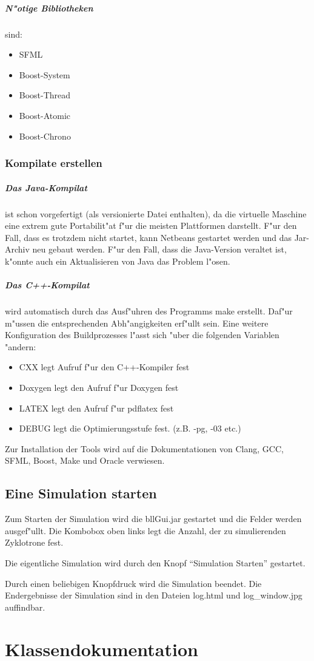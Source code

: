 \documentclass[14pt, a4paper]{report}
\begin{document}
\paragraph{N"otige Bibliotheken} sind:
\begin{itemize}
\item SFML
\item Boost-System
\item Boost-Thread
\item Boost-Atomic
\item Boost-Chrono
\end{itemize}

\subsection{Kompilate erstellen}
\paragraph{Das Java-Kompilat} ist schon vorgefertigt (als versionierte Datei enthalten), 
da die virtuelle Maschine eine 
extrem gute Portabilit"at f"ur die meisten Plattformen darstellt. F"ur den Fall, dass es
trotzdem nicht startet, kann Netbeans gestartet werden und das Jar-Archiv neu gebaut werden.
F"ur den Fall, dass die Java-Version veraltet ist, k"onnte auch ein Aktualisieren von 
Java das Problem l"osen.

\paragraph{Das C++-Kompilat} wird automatisch durch das Ausf"uhren des Programms make
erstellt. Daf"ur m"ussen die entsprechenden Abh"angigkeiten erf"ullt sein. Eine weitere
Konfiguration des Buildprozesses l"asst sich "uber die folgenden Variablen "andern:
\begin{itemize}
\item CXX legt Aufruf f"ur den C++-Kompiler fest
\item Doxygen legt den Aufruf f"ur Doxygen fest
\item LATEX legt den Aufruf f"ur pdflatex fest 
\item DEBUG legt die Optimierungsstufe fest. (z.B. -pg, -03 etc.)
\end{itemize}

Zur Installation der Tools wird auf die Dokumentationen von Clang, GCC, SFML, Boost, Make und
Oracle verwiesen.

\section{Eine Simulation starten}
Zum Starten der Simulation wird die bllGui.jar gestartet und die Felder werden 
ausgef"ullt. Die Kombobox oben links legt die Anzahl, der zu simulierenden Zyklotrone 
fest.

Die eigentliche Simulation wird durch den Knopf "`Simulation Starten"' gestartet.

Durch einen beliebigen Knopfdruck wird die Simulation beendet. Die Endergebnisse der
Simulation sind in den Dateien log.html und log\_window.jpg auffindbar.

\chapter{Klassendokumentation}
\newpage
\end{document}
